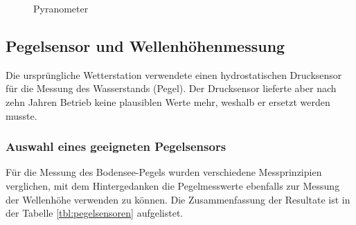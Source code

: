 \begin{figure}[htbp]
	\centering
	\caption{Pyranometer}
	\label{img:pvgis}
\end{figure}




\subsection{Pegelsensor und Wellenhöhenmessung}
Die ursprüngliche Wetterstation verwendete einen hydrostatischen Drucksensor für die Messung des Wasserstands (Pegel). Der Drucksensor lieferte aber nach zehn Jahren Betrieb keine plausiblen Werte mehr, weshalb er ersetzt werden musste.

\subsubsection{Auswahl eines geeigneten Pegelsensors}
Für die Messung des Bodensee-Pegels wurden verschiedene Messprinzipien verglichen, mit dem Hintergedanken die Pegelmesswerte ebenfalls zur Messung der Wellenhöhe verwenden zu können. Die Zusammenfassung der Resultate ist in der Tabelle \ref{tbl:pegelsensoren} aufgelistet.

